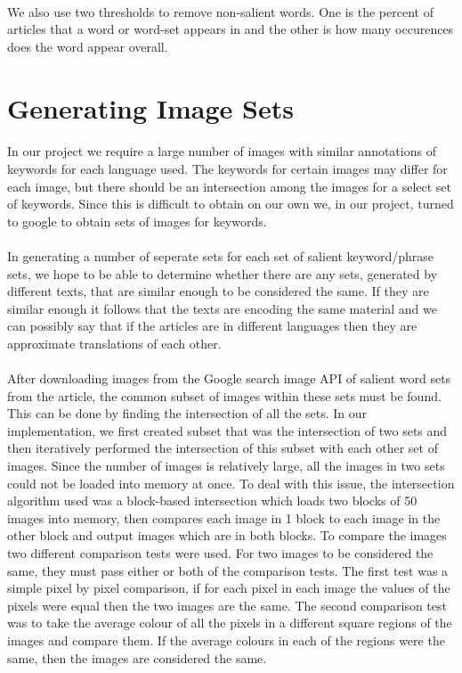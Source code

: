 \documentclass[12pt]{article}
\begin{document}
\paragraph{}
We also use two thresholds to remove non-salient words. One is the percent of articles that a word or
word-set appears in and the other is how many occurences does the word appear overall.

\section{Generating Image Sets}

\paragraph{}
In our project we require a large number of images with similar annotations of keywords for each language 
used. The keywords for certain images may differ for each image, but there should be an intersection among 
the images for a select set of keywords. Since this is difficult to obtain on our own we, in our project, 
turned to google to obtain sets of images for keywords.
\paragraph{}
In generating a number of seperate sets for each set of salient keyword/phrase sets, we hope to be able
to determine whether there are any sets, generated by different texts, that are similar enough to be
considered the same. If they are similar enough it follows that the texts are encoding the same material 
and we can possibly say that if the articles are in different languages then they are approximate 
translations of each other.
\paragraph{}
After downloading images from the Google search image API of salient word sets from the article, the common 
subset of images within these sets must be found. This can be done by finding the intersection of all the 
sets. In our implementation, we first created subset that was the intersection of two sets and then 
iteratively performed the intersection of this subset with each other set of images. Since the number of 
images is relatively large, all the images in two sets could not be loaded into memory at once. To deal with 
this issue, the intersection algorithm used was a block-based intersection which loads two blocks of 50 images 
into memory, then compares each image in 1 block to each image in the other block and output images which are 
in both blocks. To compare the images two different comparison tests were used. For two images to be considered 
the same, they must pass either or both of the comparison tests. The first test was a simple pixel by pixel 
comparison, if for each pixel in each image the values of the pixels were equal then the two images are the 
same. The second comparison test was to take the average colour of all the pixels in a different square regions 
of the images and compare them. If the average colours in each of the regions were the same, then the images 
are considered the same.
\end{document}
